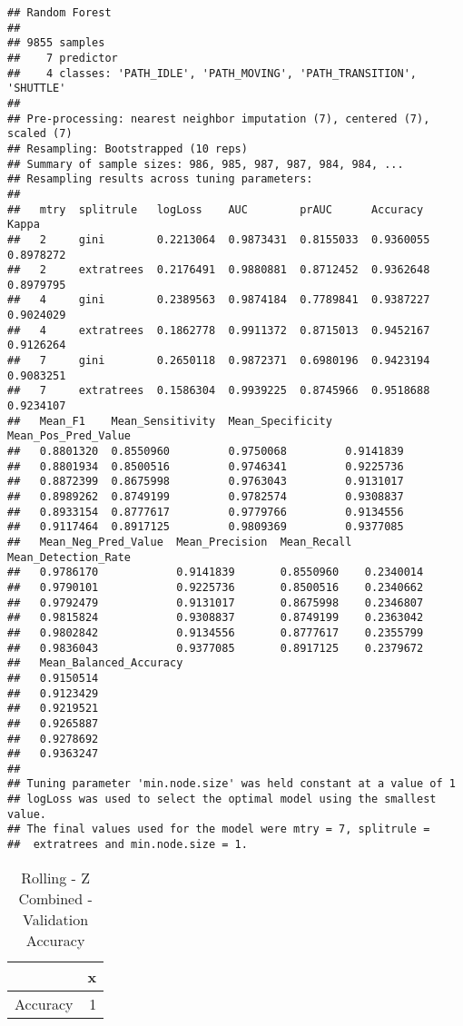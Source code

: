 \documentclass[]{article}
\begin{document}
\begin{verbatim}
## Random Forest 
## 
## 9855 samples
##    7 predictor
##    4 classes: 'PATH_IDLE', 'PATH_MOVING', 'PATH_TRANSITION', 'SHUTTLE' 
## 
## Pre-processing: nearest neighbor imputation (7), centered (7), scaled (7) 
## Resampling: Bootstrapped (10 reps) 
## Summary of sample sizes: 986, 985, 987, 987, 984, 984, ... 
## Resampling results across tuning parameters:
## 
##   mtry  splitrule   logLoss    AUC        prAUC      Accuracy   Kappa    
##   2     gini        0.2213064  0.9873431  0.8155033  0.9360055  0.8978272
##   2     extratrees  0.2176491  0.9880881  0.8712452  0.9362648  0.8979795
##   4     gini        0.2389563  0.9874184  0.7789841  0.9387227  0.9024029
##   4     extratrees  0.1862778  0.9911372  0.8715013  0.9452167  0.9126264
##   7     gini        0.2650118  0.9872371  0.6980196  0.9423194  0.9083251
##   7     extratrees  0.1586304  0.9939225  0.8745966  0.9518688  0.9234107
##   Mean_F1    Mean_Sensitivity  Mean_Specificity  Mean_Pos_Pred_Value
##   0.8801320  0.8550960         0.9750068         0.9141839          
##   0.8801934  0.8500516         0.9746341         0.9225736          
##   0.8872399  0.8675998         0.9763043         0.9131017          
##   0.8989262  0.8749199         0.9782574         0.9308837          
##   0.8933154  0.8777617         0.9779766         0.9134556          
##   0.9117464  0.8917125         0.9809369         0.9377085          
##   Mean_Neg_Pred_Value  Mean_Precision  Mean_Recall  Mean_Detection_Rate
##   0.9786170            0.9141839       0.8550960    0.2340014          
##   0.9790101            0.9225736       0.8500516    0.2340662          
##   0.9792479            0.9131017       0.8675998    0.2346807          
##   0.9815824            0.9308837       0.8749199    0.2363042          
##   0.9802842            0.9134556       0.8777617    0.2355799          
##   0.9836043            0.9377085       0.8917125    0.2379672          
##   Mean_Balanced_Accuracy
##   0.9150514             
##   0.9123429             
##   0.9219521             
##   0.9265887             
##   0.9278692             
##   0.9363247             
## 
## Tuning parameter 'min.node.size' was held constant at a value of 1
## logLoss was used to select the optimal model using the smallest value.
## The final values used for the model were mtry = 7, splitrule =
##  extratrees and min.node.size = 1.
\end{verbatim}

\begin{table}[!h]

\caption{\label{tab:sensor-z-combined-rolling-rf-results}Rolling - Z Combined - Validation Accuracy}
\centering
\begin{tabular}[t]{lr}
\toprule
  & x\\
\midrule
Accuracy & 1\\
\bottomrule
\end{tabular}
\end{table}
\end{document}
